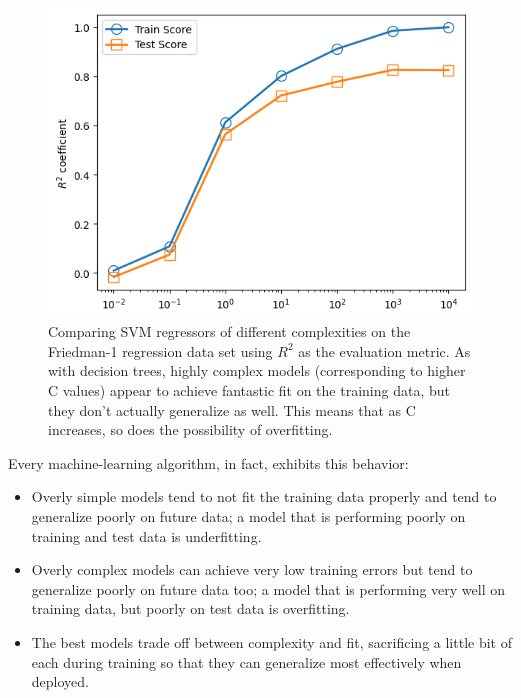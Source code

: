\begin{figure}
    \centering
    \includegraphics{../Figures/fig1-6.png}
    \caption{Comparing SVM regressors of different complexities on the
        Friedman-1 regression data set using $R^2$ as the evaluation metric. As with
        decision trees, highly complex models (corresponding to higher C values) appear
        to achieve fantastic fit on the training data, but they don’t actually generalize as
        well. This means that as C increases, so does the possibility of overfitting.}
\end{figure}

Every machine-learning algorithm, in fact, exhibits this behavior:
\begin{itemize}
    \item  Overly simple models tend to not fit the training data properly and tend to generalize poorly on future data; a model that is performing poorly on training
          and test data is underfitting.
    \item Overly complex models can achieve very low training errors but tend to generalize poorly on future data too; a model that is performing very well on training
          data, but poorly on test data is overfitting.
    \item The best models trade off between complexity and fit, sacrificing a little bit of
          each during training so that they can generalize most effectively when deployed.
\end{itemize}

